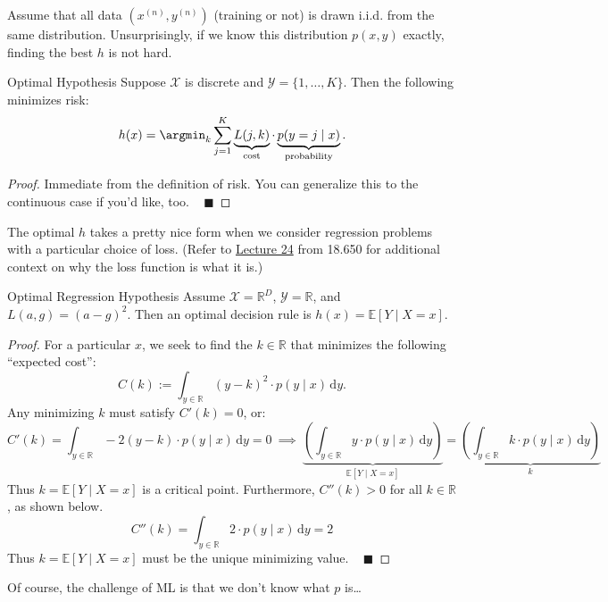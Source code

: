 Assume that all data $(x^{(n)}, y^{(n)})$ (training or not) is drawn i.i.d. from the same distribution.
Unsurprisingly, if we know this distribution $p(x, y)$ exactly, finding the best $h$ is not hard.

\begin{theorem}{Optimal Hypothesis}
    Suppose $\mathcal{X}$ is discrete and $\mathcal{Y} = \{1, \dots, K\}$.
    Then the following minimizes risk:
    \[ h(x) = \argmin_k \sum_{j = 1}^K 
    \underbrace{L(j, k)}_{\text{cost}} \cdot 
    \underbrace{p(y = j \mid x)}_{\text{probability}}. \]
\end{theorem}

\begin{proof}
    Immediate from the definition of risk. 
    You can generalize this to the continuous case if you'd like, too. ~ $\blacksquare$
\end{proof}

The optimal $h$ takes a pretty nice form when we consider regression problems
with a particular choice of loss.
(Refer to \href{/18.650/lectures/24}{Lecture 24} from 18.650
for additional context on why the loss function is what it is.)

\begin{theorem}{Optimal Regression Hypothesis}
    Assume $\mathcal{X} = \mathbb{R}^D$, $\mathcal{Y} = \mathbb{R}$, and $L(a, g) = (a - g)^2$.
    Then an optimal decision rule is $h(x) = \mathbb{E}[Y \mid X = x]$.
\end{theorem}

\begin{proof}
    For a particular $x$, we seek to find the $k \in \mathbb{R}$
    that minimizes the following ``expected cost'':
    \[ C(k) := \int_{y \in \mathbb{R}} (y - k)^2 \cdot p(y \mid x) \, \mathrm{d}y. \]
    Any minimizing $k$ must satisfy $C'(k) = 0$, or:
    \[
    C'(k) = \int_{y \in \mathbb{R}} -2(y - k) \cdot p(y \mid x) \, \mathrm{d}y = 0
    ~ \implies ~
    \underbrace{\left(\int_{y \in \mathbb{R}} y \cdot p(y \mid x) \, \mathrm{d}y\right)}_{\mathbb{E}[Y \mid X = x]} =
    \underbrace{\left(\int_{y \in \mathbb{R}} k \cdot p(y \mid x) \, \mathrm{d}y\right)}_{k}
    \]
    Thus $k = \mathbb{E}[Y \mid X = x]$ is a critical point.
    Furthermore, $C''(k) > 0$ for all $k \in \mathbb{R}$, as shown below.
    \[ C''(k) = \int_{y \in \mathbb{R}} 2 \cdot p(y \mid x) \, \mathrm{d}y = 2 \]
    Thus $k = \mathbb{E}[Y \mid X = x]$ must be the unique minimizing value. ~ $\blacksquare$
\end{proof}

Of course, the challenge of ML is that we don't know what $p$ is\dots

